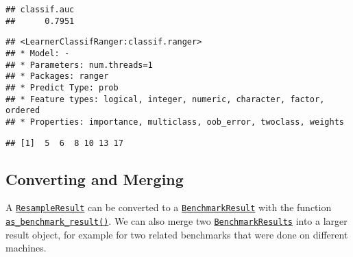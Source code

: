 \documentclass[
]{scrbook}
\newenvironment{Shaded}{\begin{snugshade}}{\end{snugshade}}
\newcommand{\CommentTok}[1]{\textcolor[rgb]{0.56,0.35,0.01}{\textit{#1}}}
\newcommand{\FunctionTok}[1]{\textcolor[rgb]{0.00,0.00,0.00}{#1}}
\newcommand{\NormalTok}[1]{#1}
\newcommand{\OtherTok}[1]{\textcolor[rgb]{0.56,0.35,0.01}{#1}}
\newcommand{\SpecialCharTok}[1]{\textcolor[rgb]{0.00,0.00,0.00}{#1}}
\renewenvironment{Shaded} {\begin{snugshade}\small} {\end{snugshade}}
\begin{document}
\begin{verbatim}
## classif.auc 
##      0.7951
\end{verbatim}

\begin{Shaded}
\end{Shaded}

\begin{verbatim}
## <LearnerClassifRanger:classif.ranger>
## * Model: -
## * Parameters: num.threads=1
## * Packages: ranger
## * Predict Type: prob
## * Feature types: logical, integer, numeric, character, factor, ordered
## * Properties: importance, multiclass, oob_error, twoclass, weights
\end{verbatim}

\begin{Shaded}
\end{Shaded}

\begin{verbatim}
## [1]  5  6  8 10 13 17
\end{verbatim}

\hypertarget{converting-and-merging}{%
\subsection{Converting and Merging}\label{converting-and-merging}}

A \href{https://mlr3.mlr-org.com/reference/ResampleResult.html}{\texttt{ResampleResult}} can be converted to a \href{https://mlr3.mlr-org.com/reference/BenchmarkResult.html}{\texttt{BenchmarkResult}} with the function \href{https://mlr3.mlr-org.com/reference/as_benchmark_result.html}{\texttt{as\_benchmark\_result()}}.
We can also merge two \href{https://mlr3.mlr-org.com/reference/BenchmarkResult.html}{\texttt{BenchmarkResults}} into a larger result object, for example for two related benchmarks that were done on different machines.
\end{document}
